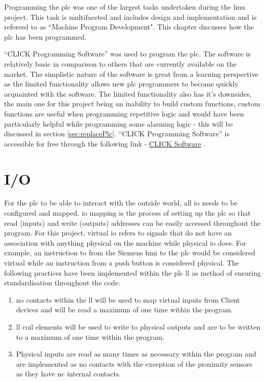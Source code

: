 Programming the \acrshort{plc} was one of the largest tasks undertaken during the \acrshort{lmu} project. This task is multifaceted and includes design and implementation and is refereed to as ``Machine Program Development". This chapter discusses how the \acrshort{plc} has been programmed.

``CLICK Programming Software'' was used to program the \acrshort{plc}. The software is relatively basic in comparison to others that are currently available on the market. The simplistic nature of the software is great from a learning perspective as the limited functionality allows new \acrshort{plc} programmers to become quickly acquainted with the software. The limited functionality also has it's downsides, the main one for this project being an inability to build custom functions, custom functions are useful when programming repetitive logic and would have been particularly helpful while programming some alarming logic - this will be discussed in section \ref{sec:replacePlc}. ``CLICK Programming Software'' is accessible for free through the following link - \href{https://www.automationdirect.com/clickplcs/free-software/free-click-software}{CLICK Software} \cite{clickSoftwareDownload}.


\section{I/O}
    For the \acrshort{plc} to be able to interact with the outside world, all \acrshort{io} needs to be configured and mapped. \acrshort{io} mapping is the process of setting up the \acrshort{plc} so that read (inputs) and write (outputs) addresses can be easily accessed throughout the program. 
    For this project, virtual \acrshort{io} refers to signals that do not have an association with anything physical on the machine while physical \acrshort{io} does. For example, an instruction to from the Siemens \acrshort{hmi} to the \acrshort{plc} would be considered virtual while an instruction from a push button is considered physical. The following practices have been implemented within the \acrshort{plc} \acrshort{ll} as method of ensuring standardisation throughout the code:
    
    \begin{enumerate}
        \item \acrshort{no} contacts within the \acrshort{ll} will be used to map virtual inputs from Client devices and will be read a maximum of one time within the program.
        \item \acrshort{ll} coil elements will be used to write to physical outputs and are to be written to a maximum of one time within the program. 
        \item Physical inputs are read as many times as necessary within the program and are implemented as \acrshort{no} contacts with the exception of the proximity sensors as they have \acrshort{nc} internal contacts. 
    \end{enumerate}

